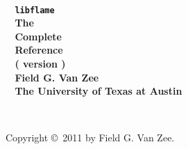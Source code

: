 \pagestyle{headings}


%
%
%
%
%
%
%
%
%

~
\vspace{1.5in}
\\
\noindent
{
\bf
\Huge
\mbox{~} \hfill {\tt libflame} \\[0.3in]
\LARGE
\mbox{~} \hfill The \\[0.255in] %
\LARGE
\mbox{~} \hfill Complete \\[0.20in]
\LARGE
\mbox{~} \hfill Reference \\[0.235in]
\LARGE
\mbox{~} \hfill ( version ) \\[0.60in]
\noindent
\LARGE
\mbox{~} \hfill Field G. Van Zee \\[0.1in]
\LARGE
\mbox{~} \hfill \rm The University of Texas at Austin%
}

\pagestyle{empty}

\newpage

~
\vspace{3.4in}

\noindent
Copyright \copyright\ 2011 by Field G. Van Zee.
\vspace{0.2in}

